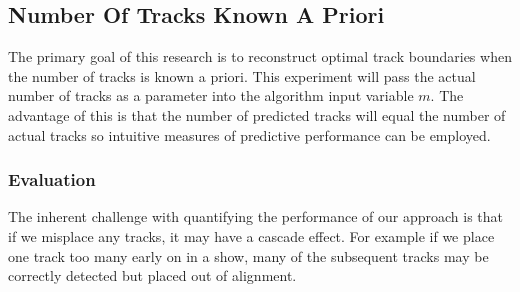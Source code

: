\documentclass[twocolumn]{article}
\begin{document}
\begin{table}[t]
	
	\centering
	\caption{The shows randomly selected for inclusion in the \textit{GitHub training set}.}
	\label{table:githubset}
	
\end{table}

\subsection{Number Of Tracks Known A Priori}\label{sec:apriori}

The primary goal of this research is to reconstruct optimal track boundaries when the number of tracks is known a priori. This experiment will pass the actual number of tracks as a parameter into the algorithm input variable $m$. The advantage of this is that the number of predicted tracks will equal the number of actual tracks so intuitive measures of predictive performance can be employed. 

\subsubsection{Evaluation}\label{eval_crit}

The inherent challenge with quantifying the performance of our approach is that if we misplace any tracks, it may have a cascade effect. For example if we place one track too many early on in a show, many of the subsequent tracks may be correctly detected but placed out of alignment. 
\end{document}
